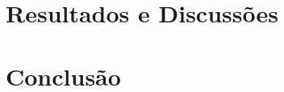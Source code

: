 \chapter{Resultados e Discussões}
\label{cap:resultados}









\chapter{Conclusão}
\label{cap:conclusao}




